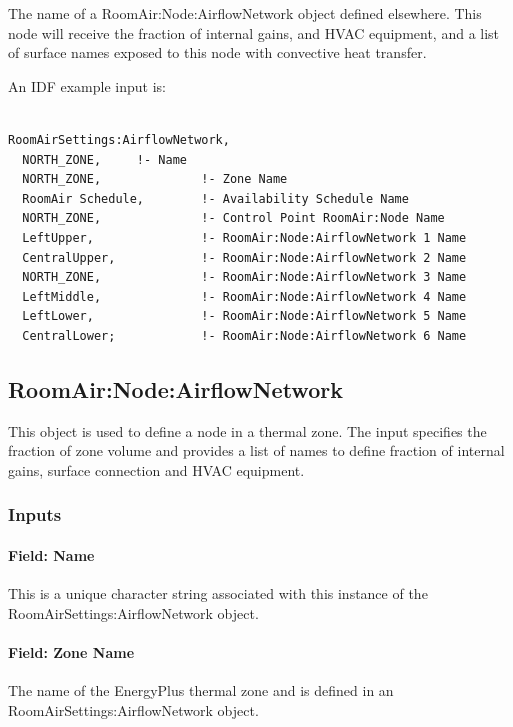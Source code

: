 The name of a RoomAir:Node:AirflowNetwork object defined elsewhere. This node will receive the fraction of internal gains, and HVAC equipment, and a list of surface names exposed to this node with convective heat transfer.

An IDF example input is:

\begin{lstlisting}

RoomAirSettings:AirflowNetwork,
  NORTH_ZONE,     !- Name 
  NORTH_ZONE,              !- Zone Name
  RoomAir Schedule,        !- Availability Schedule Name
  NORTH_ZONE,              !- Control Point RoomAir:Node Name
  LeftUpper,               !- RoomAir:Node:AirflowNetwork 1 Name
  CentralUpper,            !- RoomAir:Node:AirflowNetwork 2 Name
  NORTH_ZONE,              !- RoomAir:Node:AirflowNetwork 3 Name
  LeftMiddle,              !- RoomAir:Node:AirflowNetwork 4 Name
  LeftLower,               !- RoomAir:Node:AirflowNetwork 5 Name
  CentralLower;            !- RoomAir:Node:AirflowNetwork 6 Name
\end{lstlisting}

\subsection{RoomAir:Node:AirflowNetwork}\label{roomairnodeairflownetwork}

This object is used to define a node in a thermal zone. The input specifies the fraction of zone volume and provides a list of names to define fraction of internal gains, surface connection and HVAC equipment.

\subsubsection{Inputs}\label{inputs-13-012}

\paragraph{Field: Name}\label{field-name-8-017}

This is a unique character string associated with this instance of the Room\-Air\-Settings:\-Air\-flow\-Net\-work object.

\paragraph{Field: Zone Name}\label{field-zone-name-9-000}

The name of the EnergyPlus thermal zone and is defined in an Room\-Air\-Settings:\-Air\-flow\-Net\-work object.

